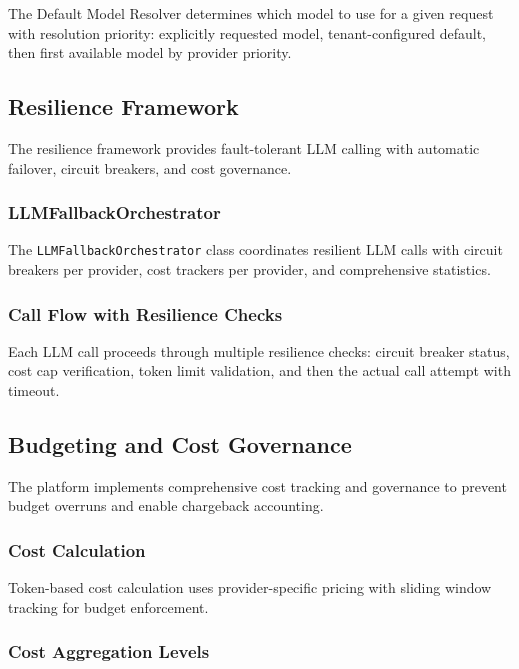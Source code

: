 \documentclass[a4paper,twoside]{sapthesis}
\begin{document}
The Default Model Resolver determines which model to use for a given request with resolution priority: explicitly requested model, tenant-configured default, then first available model by provider priority.

\subsection{Resilience Framework}
\label{subsec:resilience-framework}

The resilience framework provides fault-tolerant LLM calling with automatic failover, circuit breakers, and cost governance.

\subsubsection{LLMFallbackOrchestrator}

The \texttt{LLMFallbackOrchestrator} class coordinates resilient LLM calls with circuit breakers per provider, cost trackers per provider, and comprehensive statistics.

\subsubsection{Call Flow with Resilience Checks}

Each LLM call proceeds through multiple resilience checks: circuit breaker status, cost cap verification, token limit validation, and then the actual call attempt with timeout.

\subsection{Budgeting and Cost Governance}
\label{subsec:budgeting}

The platform implements comprehensive cost tracking and governance to prevent budget overruns and enable chargeback accounting.

\subsubsection{Cost Calculation}

Token-based cost calculation uses provider-specific pricing with sliding window tracking for budget enforcement.

\subsubsection{Cost Aggregation Levels}
\end{document}
